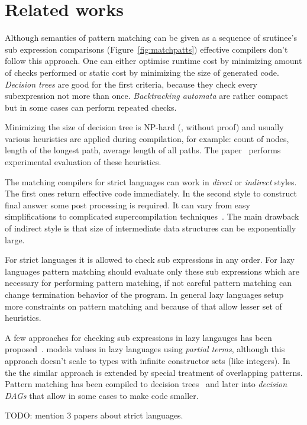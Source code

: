 \section{Related works}
\label{sec:related}

Although semantics of pattern matching can be given as a sequence of srutinee's sub expression comparisons (Figure~\ref{fig:matchpatts}) effective compilers don't follow this approach. One can either optimise runtime cost by minimizing amount of checks performed or static cost by minimizing the size of generated code. \emph{Decision trees} are good for the first criteria, because they check every subexpression not more than once. \emph{Backtracking automata} are rather compact but in some cases can perform repeated checks.


Minimizing the size of decision tree is  NP-hard (\cite{macqueen1985}, without proof) and usually various heuristics are applied during compilation, for example: count of nodes, length of the longest path, average length of all paths. The paper~\cite{Ramsey2000} performs experimental evaluation of these heuristics.

The matching compilers for strict languages can work in \emph{direct} or \emph{indirect} styles. The first ones return effective code immediately. In the second style to construct final answer some post processing is required. It can vary from easy simplifications to complicated supercompilation techniques~\cite{Setsoft1996}. The main drawback of indirect style is that size of intermediate data structures can be exponentially large.

For strict languages it is allowed to check sub expressions in any order. For lazy languages pattern matching should evaluate only these sub expressions which are necessary for performing pattern matching, if not careful pattern matching can change termination behavior of the program.  In general lazy languages setup more constraints on pattern matching and because of that allow lesser set of heuristics.

A few approaches for checking sub expressions in lazy langauges has been proposed~\cite{Augustsson1985,Laville1991}. \cite{laville1991} models values in lazy languages using \emph{partial terms}, although this approach doesn't scale to types with infinite constructor sets (like integers). In  the \cite{suarez1993} the similar approach is extended by special treatment of overlapping patterns. Pattern matching has been compiled to decision trees~\cite{maranget1992} and later \cite{maranget1992} into \emph{decision DAGs} that allow in some cases to make code smaller.

TODO: mention 3 papers about strict languages.
